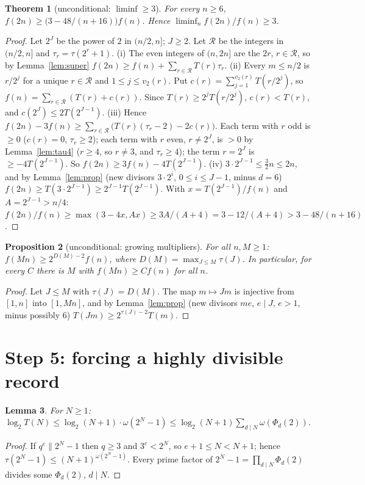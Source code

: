 \documentclass[11pt]{article}
\newtheorem{theorem}{Theorem}
\newtheorem{lemma}[theorem]{Lemma}
\newtheorem{proposition}[theorem]{Proposition}
\theoremstyle{remark}
\begin{document}
\begin{theorem}[unconditional: $\liminf\ge3$]\label{thm:three}
For every $n\ge6$, $f(2n)\ge\big(3-48/(n+16)\big)f(n)$. Hence $\liminf_n f(2n)/f(n)\ge3$.
\end{theorem}
\begin{proof}
Let $2^J$ be the power of $2$ in $(n/2,n]$; $J\ge2$. Let $\mathcal R$ be the integers in $(n/2,n]$
and $\tau_r=\tau(2^r+1)$.
(i) The even integers of $(n,2n]$ are the $2r$, $r\in\mathcal R$, so by Lemma~\ref{lem:super}
$f(2n)\ge f(n)+\sum_{r\in\mathcal R}T(r)\tau_r$.
(ii) Every $m\le n/2$ is $r/2^j$ for a unique $r\in\mathcal R$ and $1\le j\le v_2(r)$. Put
$c(r)=\sum_{j=1}^{v_2(r)}T(r/2^j)$, so $f(n)=\sum_{r\in\mathcal R}(T(r)+c(r))$. Since
$T(r)\ge2^jT(r/2^j)$, $c(r)<T(r)$, and $c(2^J)\le2T(2^{J-1})$.
(iii) Hence $f(2n)-3f(n)\ge\sum_{r\in\mathcal R}\big(T(r)(\tau_r-2)-2c(r)\big)$. Each term with $r$ odd
is $\ge0$ ($c(r)=0$, $\tau_r\ge2$); each term with $r$ even, $r\ne2^J$, is $>0$ by
Lemma~\ref{lem:tau4} ($r\ge4$, so $r\neq 3$, and $\tau_r\ge4$); the term $r=2^J$ is
$\ge-4T(2^{J-1})$. So $f(2n)\ge3f(n)-4T(2^{J-1})$.
(iv) $3\cdot2^{J-1}\le\frac32n\le2n$, and by Lemma~\ref{lem:prop} (new divisors $3\cdot2^i$,
$0\le i\le J-1$, minus $d=6$) $f(2n)\ge T(3\cdot2^{J-1})\ge2^{J-1}T(2^{J-1})$.
With $x=T(2^{J-1})/f(n)$ and $A=2^{J-1}>n/4$:
$f(2n)/f(n)\ge\max(3-4x,Ax)\ge3A/(A+4)=3-12/(A+4)>3-48/(n+16)$.
\end{proof}

\begin{proposition}[unconditional: growing multipliers]\label{prop:mult}
For all $n,M\ge1$: $f(Mn)\ge2^{D(M)-2}f(n)$, where $D(M)=\max_{J\le M}\tau(J)$. In particular, for
every $C$ there is $M$ with $f(Mn)\ge Cf(n)$ for all $n$.
\end{proposition}
\begin{proof}
Let $J\le M$ with $\tau(J)=D(M)$. The map $m\mapsto Jm$ is injective from $[1,n]$ into $[1,Mn]$,
and by Lemma~\ref{lem:prop} (new divisors $me$, $e\mid J$, $e>1$, minus possibly $6$)
$T(Jm)\ge2^{\tau(J)-2}T(m)$.
\end{proof}

\section{Step 5: forcing a highly divisible record}

\begin{lemma}\label{lem:upper}
For $N\ge1$: $\log_2T(N)\le\log_2(N+1)\cdot\omega(2^N-1)\le\log_2(N+1)\sum_{d\mid N}\omega(\Phi_d(2))$.
\end{lemma}
\begin{proof}
If $q^e\parallel2^N-1$ then $q\ge3$ and $3^e<2^N$, so $e+1\le N<N+1$; hence
$\tau(2^N-1)\le(N+1)^{\omega(2^N-1)}$. Every prime factor of $2^N-1=\prod_{d\mid N}\Phi_d(2)$
divides some $\Phi_d(2)$, $d\mid N$.
\end{proof}
\end{document}

